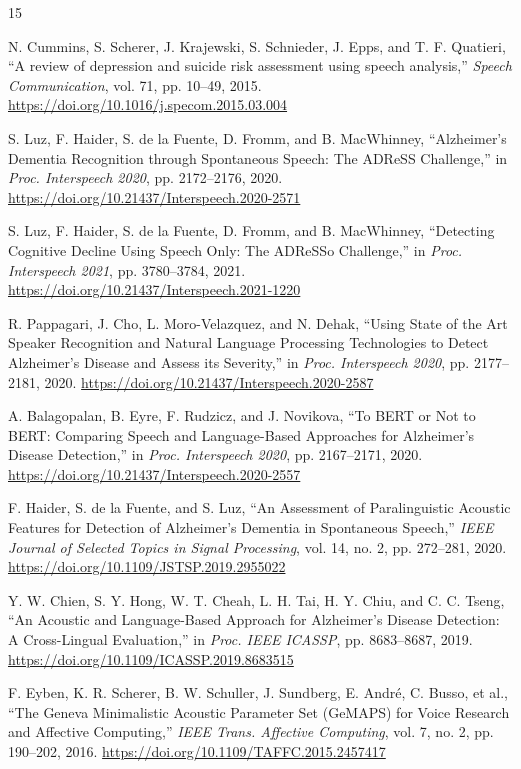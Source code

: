 \documentclass[conference]{IEEEtran}
\begin{document}
\begin{thebibliography}{15}

N. Cummins, S. Scherer, J. Krajewski, S. Schnieder, J. Epps, and T. F. Quatieri, ``A review of depression and suicide risk assessment using speech analysis,'' \emph{Speech Communication}, vol. 71, pp. 10--49, 2015. \url{https://doi.org/10.1016/j.specom.2015.03.004}

S. Luz, F. Haider, S. de la Fuente, D. Fromm, and B. MacWhinney, ``Alzheimer's Dementia Recognition through Spontaneous Speech: The ADReSS Challenge,'' in \emph{Proc. Interspeech 2020}, pp. 2172--2176, 2020. \url{https://doi.org/10.21437/Interspeech.2020-2571}

S. Luz, F. Haider, S. de la Fuente, D. Fromm, and B. MacWhinney, ``Detecting Cognitive Decline Using Speech Only: The ADReSSo Challenge,'' in \emph{Proc. Interspeech 2021}, pp. 3780--3784, 2021. \url{https://doi.org/10.21437/Interspeech.2021-1220}

R. Pappagari, J. Cho, L. Moro-Velazquez, and N. Dehak, ``Using State of the Art Speaker Recognition and Natural Language Processing Technologies to Detect Alzheimer's Disease and Assess its Severity,'' in \emph{Proc. Interspeech 2020}, pp. 2177--2181, 2020. \url{https://doi.org/10.21437/Interspeech.2020-2587}

A. Balagopalan, B. Eyre, F. Rudzicz, and J. Novikova, ``To BERT or Not to BERT: Comparing Speech and Language-Based Approaches for Alzheimer's Disease Detection,'' in \emph{Proc. Interspeech 2020}, pp. 2167--2171, 2020. \url{https://doi.org/10.21437/Interspeech.2020-2557}

F. Haider, S. de la Fuente, and S. Luz, ``An Assessment of Paralinguistic Acoustic Features for Detection of Alzheimer's Dementia in Spontaneous Speech,'' \emph{IEEE Journal of Selected Topics in Signal Processing}, vol. 14, no. 2, pp. 272--281, 2020. \url{https://doi.org/10.1109/JSTSP.2019.2955022}

Y. W. Chien, S. Y. Hong, W. T. Cheah, L. H. Tai, H. Y. Chiu, and C. C. Tseng, ``An Acoustic and Language-Based Approach for Alzheimer's Disease Detection: A Cross-Lingual Evaluation,'' in \emph{Proc. IEEE ICASSP}, pp. 8683--8687, 2019. \url{https://doi.org/10.1109/ICASSP.2019.8683515}

F. Eyben, K. R. Scherer, B. W. Schuller, J. Sundberg, E. Andr{\'e}, C. Busso, et al., ``The Geneva Minimalistic Acoustic Parameter Set (GeMAPS) for Voice Research and Affective Computing,'' \emph{IEEE Trans. Affective Computing}, vol. 7, no. 2, pp. 190--202, 2016. \url{https://doi.org/10.1109/TAFFC.2015.2457417}


\end{thebibliography}
\end{document}
